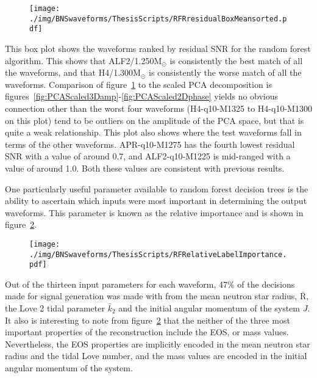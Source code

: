 \begin{figure}[H]
	\centering
	\texttt{[image: ./img/BNSwaveforms/ThesisScripts/RFRresidualBoxMeansorted.pdf]} 
	\caption[\protect]{\protect}
	\label{fig:RFRresidualBoxMeansorted}
\end{figure}
This box plot shows the waveforms ranked by residual SNR for the random forest algorithm. This shows that ALF2/1.250M$_\odot$ is consistently the best match of all the waveforms, and that H4/1.300M$_\odot$ is consistently the worse match of all the waveforms. Comparison of figure~\ref{fig:RFRresidualBoxMeansorted} to the scaled PCA decomposition is figures~\ref{fig:PCAScaled3Damp}-\ref{fig:PCAScaled2Dphase} yields no obvious connection other than the worst four waveforms (H4-q10-M1325 to H4-q10-M1300 on this plot) tend to be outliers on the amplitude of the PCA space, but that is quite a weak relationship. This plot also shows where the test waveforms fall in terms of the other waveforms. APR-q10-M1275 has the fourth lowest residual SNR with  a value of around 0.7, and ALF2-q10-M1225 is mid-ranged with a value of around 1.0. Both these values are consistent with previous results.\par 

One particularly useful parameter available to random forest decision trees is the ability to ascertain which inputs were most important in determining the output waveforms. This parameter is known as the relative importance and is shown in figure~\ref{fig:RFRelativeLabelImportance}. 
\begin{figure}[H]
		\centering
		\texttt{[image: ./img/BNSwaveforms/ThesisScripts/RFRelativeLabelImportance.pdf]} 
		\caption[\protect]{\protect}
		\label{fig:RFRelativeLabelImportance}
\end{figure}
Out of the thirteen input parameters for each waveform, 47\% of the decisions made for signal generation was made with from the mean neutron star radius, $\bar{\text{R}}$, the Love 2 tidal parameter $\bar{k}_2$ and the initial angular momentum of the system $J$. It also is interesting to note from figure~\ref{fig:RFRelativeLabelImportance} that the neither of the three most important properties of the reconstruction include the EOS, or mass values. Nevertheless, the EOS properties are implicitly encoded in the mean neutron star radius and the tidal Love number, and the mass values are encoded in the initial angular momentum of the system.
